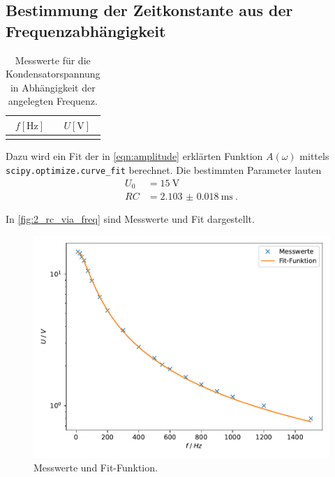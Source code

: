 \clearpage
\subsection{Bestimmung der Zeitkonstante aus der Frequenzabhängigkeit}
\label{auswertung:2}

\begin{table}
  \centering
  \caption{Messwerte für die Kondensatorspannung in Abhängigkeit der angelegten Frequenz.}
  \label{tab:mess_2}
  \begin{tabular}{S[table-format=4.0] S[table-format=2.1]}
  \toprule
  $f [\si{\hertz}]$ &
  $U [\si{\volt}]$ \\
  \midrule
  \bottomrule
  \end{tabular}
\end{table}

Dazu wird ein Fit der in \autoref{eqn:amplitude} erklärten Funktion $A(\omega)$
mittels \texttt{scipy.optimize.curve\_fit} berechnet.
Die bestimmten Parameter lauten
\begin{align*}
  U_0 &= \SI{15}{\volt} \\
  RC &= \SI{2.103(18)}{\milli\second} \ .
\end{align*}

In \autoref{fig:2_rc_via_freq} sind Messwerte und Fit dargestellt.

\begin{figure}
    \centering
    \includegraphics[width=\textwidth]{build/plt/2_rc_via_freq.pdf}
    \caption{Messwerte und Fit-Funktion.}
    \label{fig:2_rc_via_freq}
\end{figure}

